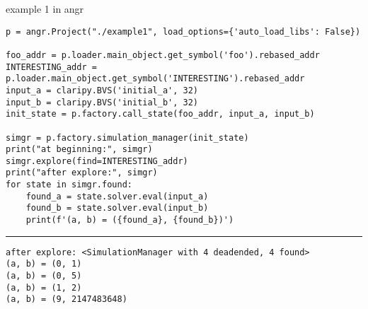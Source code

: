\begin{frame}[fragile]{example 1 in angr}
\begin{Verbatim}[fontsize=\fontsize{10}{11},commandchars=\\\{\}]
p = angr.Project("./example1", load_options={'auto_load_libs': False})

foo_addr = p.loader.main_object.get_symbol('foo').rebased_addr
INTERESTING_addr = p.loader.main_object.get_symbol('INTERESTING').rebased_addr
input_a = claripy.BVS('initial_a', 32)
input_b = claripy.BVS('initial_b', 32)
init_state = p.factory.call_state(foo_addr, input_a, input_b)

simgr = p.factory.simulation_manager(init_state)
print("at beginning:", simgr)
simgr.explore(find=INTERESTING_addr)
print("after explore:", simgr)
for state in simgr.found:
    found_a = state.solver.eval(input_a)
    found_b = state.solver.eval(input_b)
    print(f'(a, b) = ({found_a}, {found_b})')
\end{Verbatim}
\hrule
\begin{Verbatim}[fontsize=\fontsize{10}{11}]
after explore: <SimulationManager with 4 deadended, 4 found>                                             
(a, b) = (0, 1)                                                                                          
(a, b) = (0, 5)                                                                                          
(a, b) = (1, 2)                                                                                          
(a, b) = (9, 2147483648)   
\end{Verbatim}
\end{frame}

